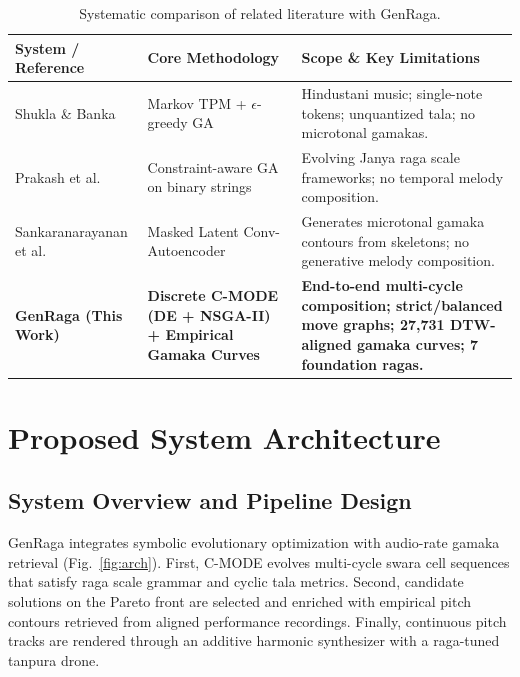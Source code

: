 \documentclass[12pt,a4paper]{report}
\begin{document}
\begin{table}[h!]
\centering
\caption{Systematic comparison of related literature with GenRaga.}
\label{tab:lit_comparison}
\vspace{0.5em}
\footnotesize
\begin{tabular}{@{}>{\raggedright\arraybackslash}p{}>{\raggedright\arraybackslash}p{}>{\raggedright\arraybackslash}p{}@{}}
\toprule
\textbf{System / Reference} & \textbf{Core Methodology} & \textbf{Scope \& Key Limitations} \\
\midrule
Shukla \& Banka~\cite{shukla2023} & Markov TPM + $\epsilon$-greedy GA & Hindustani music; single-note tokens; unquantized tala; no microtonal gamakas. \\
Prakash et al.~\cite{prakash2026} & Constraint-aware GA on binary strings & Evolving Janya raga scale frameworks; no temporal melody composition. \\
Sankaranarayanan et al.~\cite{gamaka2022,gamaka2025} & Masked Latent Conv-Autoencoder & Generates microtonal gamaka contours from skeletons; no generative melody composition. \\
\textbf{GenRaga (This Work)} & \textbf{Discrete C-MODE (DE + NSGA-II) + Empirical Gamaka Curves} & \textbf{End-to-end multi-cycle composition; strict/balanced move graphs; 27,731 DTW-aligned gamaka curves; 7 foundation ragas.} \\
\bottomrule
\end{tabular}
\end{table}

\chapter{Proposed System Architecture}

\section{System Overview and Pipeline Design}
GenRaga integrates symbolic evolutionary optimization with audio-rate gamaka retrieval (Fig.~\ref{fig:arch}). First, C-MODE evolves multi-cycle swara cell sequences that satisfy raga scale grammar and cyclic tala metrics. Second, candidate solutions on the Pareto front are selected and enriched with empirical pitch contours retrieved from aligned performance recordings. Finally, continuous pitch tracks are rendered through an additive harmonic synthesizer with a raga-tuned tanpura drone.
\end{document}
